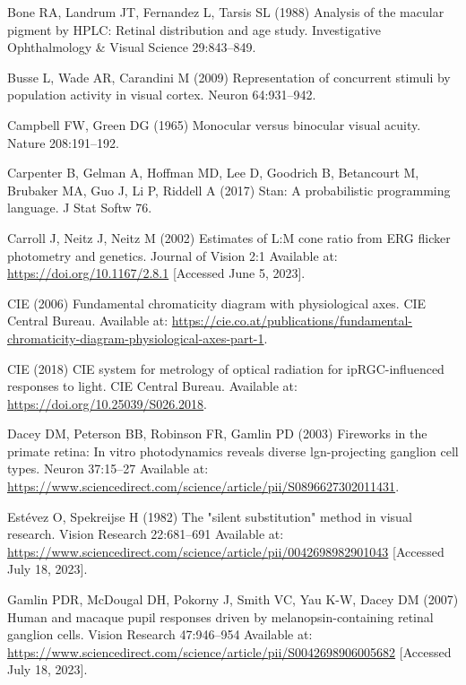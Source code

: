 \documentclass[
]{article}
\begin{document}
\leavevmode\hypertarget{ref-Bone1988}{}%
Bone RA, Landrum JT, Fernandez L, Tarsis SL (1988) Analysis of the macular pigment by HPLC: Retinal distribution and age study. Investigative Ophthalmology \& Visual Science 29:843--849.

\leavevmode\hypertarget{ref-Busse2009}{}%
Busse L, Wade AR, Carandini M (2009) Representation of concurrent stimuli by population activity in visual cortex. Neuron 64:931--942.

\leavevmode\hypertarget{ref-Campbell1965}{}%
Campbell FW, Green DG (1965) Monocular versus binocular visual acuity. Nature 208:191--192.

\leavevmode\hypertarget{ref-Carpenter2017}{}%
Carpenter B, Gelman A, Hoffman MD, Lee D, Goodrich B, Betancourt M, Brubaker MA, Guo J, Li P, Riddell A (2017) Stan: A probabilistic programming language. J Stat Softw 76.

\leavevmode\hypertarget{ref-Carroll2002}{}%
Carroll J, Neitz J, Neitz M (2002) Estimates of L:M cone ratio from ERG flicker photometry and genetics. Journal of Vision 2:1 Available at: \url{https://doi.org/10.1167/2.8.1} {[}Accessed June 5, 2023{]}.

\leavevmode\hypertarget{ref-CIE2006}{}%
CIE (2006) Fundamental chromaticity diagram with physiological axes. CIE Central Bureau. Available at: \url{https://cie.co.at/publications/fundamental-chromaticity-diagram-physiological-axes-part-1}.

\leavevmode\hypertarget{ref-CIE2018}{}%
CIE (2018) CIE system for metrology of optical radiation for ipRGC-influenced responses to light. CIE Central Bureau. Available at: \url{https://doi.org/10.25039/S026.2018}.

\leavevmode\hypertarget{ref-Dacey2003}{}%
Dacey DM, Peterson BB, Robinson FR, Gamlin PD (2003) Fireworks in the primate retina: In vitro photodynamics reveals diverse lgn-projecting ganglion cell types. Neuron 37:15--27 Available at: \url{https://www.sciencedirect.com/science/article/pii/S0896627302011431}.

\leavevmode\hypertarget{ref-Estevez1982}{}%
Estévez O, Spekreijse H (1982) The "silent substitution" method in visual research. Vision Research 22:681--691 Available at: \url{https://www.sciencedirect.com/science/article/pii/0042698982901043} {[}Accessed July 18, 2023{]}.

\leavevmode\hypertarget{ref-Gamlin2007}{}%
Gamlin PDR, McDougal DH, Pokorny J, Smith VC, Yau K-W, Dacey DM (2007) Human and macaque pupil responses driven by melanopsin-containing retinal ganglion cells. Vision Research 47:946--954 Available at: \url{https://www.sciencedirect.com/science/article/pii/S0042698906005682} {[}Accessed July 18, 2023{]}.
\end{document}
